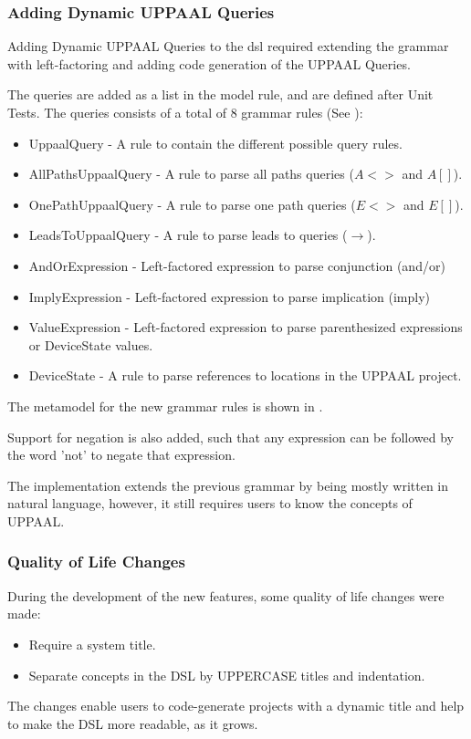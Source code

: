 \subsubsection{Adding Dynamic UPPAAL Queries}

Adding Dynamic UPPAAL Queries to the \acrshort{dsl} required extending the grammar with left-factoring and adding code generation of the UPPAAL Queries.

The queries are added as a list in the model rule, and are defined after Unit Tests. The queries consists of a total of 8 grammar rules (See ):

\begin{itemize}
    \item UppaalQuery - A rule to contain the different possible query rules.
    \item AllPathsUppaalQuery - A rule to parse all paths queries ($A<>$ and $A[]$).
    \item OnePathUppaalQuery - A rule to parse one path queries ($E<>$ and $E[]$).
    \item LeadsToUppaalQuery - A rule to parse leads to queries ($\rightarrow$).
    \item AndOrExpression - Left-factored expression to parse conjunction (and/or)
    \item ImplyExpression - Left-factored expression to parse implication (imply)
    \item ValueExpression - Left-factored expression to parse parenthesized expressions or DeviceState values.
    \item DeviceState - A rule to parse references to locations in the UPPAAL project.
\end{itemize}

The metamodel for the new grammar rules is shown in .

Support for negation is also added, such that any expression can be followed by the word 'not' to negate that expression.

The implementation extends the previous grammar by being mostly written in natural language, however, it still requires users to know the concepts of UPPAAL. \cite{uppaal-docs}

\subsubsection{Quality of Life Changes}

During the development of the new features, some quality of life changes were made:

\begin{itemize}
    \item Require a system title.
    \item Separate concepts in the DSL by UPPERCASE titles and indentation.
\end{itemize}

The changes enable users to code-generate projects with a dynamic title and help to make the DSL more readable, as it grows.
